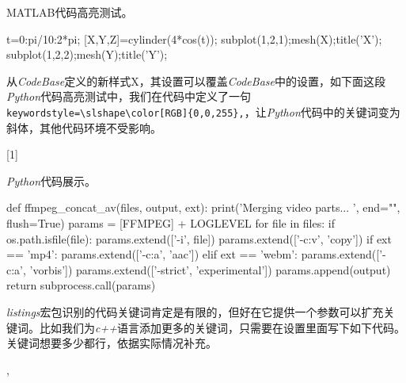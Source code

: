 MATLAB代码高亮测试。

\begin{Matlab}{}
t=0:pi/10:2*pi;
[X,Y,Z]=cylinder(4*cos(t));
subplot(1,2,1);mesh(X);title('X');
subplot(1,2,2);mesh(Y);title('Y');
\end{Matlab}

从\emph{CodeBase}定义的新样式X，其设置可以覆盖\emph{CodeBase}中的设置，如下面这段\emph{Python}代码高亮测试中，我们在代码中定义了一句\verb|keywordstyle=\slshape\color[RGB]{0,0,255},|，让\emph{Python}代码中的关键词变为斜体，其他代码环境不受影响。

\begin{latex}{}
[1]{\lstset{style=python}}{}
\end{latex}

\emph{Python}代码展示。

\begin{python}{}
def ffmpeg_concat_av(files, output, ext):
	print('Merging video parts... ', end="", flush=True)
	params = [FFMPEG] + LOGLEVEL
	for file in files:
		if os.path.isfile(file): params.extend(['-i', file])
	params.extend(['-c:v', 'copy'])
	if ext == 'mp4':
		params.extend(['-c:a', 'aac'])
	elif ext == 'webm':
		params.extend(['-c:a', 'vorbis'])
	params.extend(['-strict', 'experimental'])
	params.append(output)
	return subprocess.call(params)
\end{python}

\emph{listings}宏包识别的代码关键词肯定是有限的，但好在它提供一个参数可以扩充关键词。比如我们为\emph{c++}语言添加更多的关键词，只需要在设置里面写下如下代码。关键词想要多少都行，依据实际情况补充。

\begin{latex}{}
,
\end{latex}


